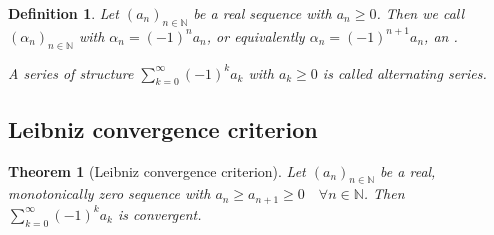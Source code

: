 \documentclass[a4paper,landscape,twocolumn]{article}
\newtheorem{theorem}{Theorem}
\newtheorem{defi}{Definition}
\newcommand\seq[1]{{\left(#1\right)}_{n \in \mathbb N}}
\begin{document}
\begin{defi}
  Let $\seq{a_n}$ be a real sequence with $a_n \geq 0$.
  Then we call $\seq{\alpha_n}$ with $\alpha_n = (-1)^n a_n$, or equivalently
  $\alpha_n = (-1)^{n+1} a_n$, an .

  A series of structure $\sum_{k=0}^\infty (-1)^k a_k$ with $a_k \geq 0$
  is called \emph{alternating series}.
\end{defi}

\subsection{Leibniz convergence criterion}
\begin{theorem}[Leibniz convergence criterion]
  Let $\seq{a_n}$ be a real, monotonically zero sequence with $a_n \geq a_{n+1} \geq 0
  \quad\forall n \in \mathbb N$.
  Then $\sum_{k=0}^\infty (-1)^k a_k$ is convergent.
\end{theorem}
\end{document}
